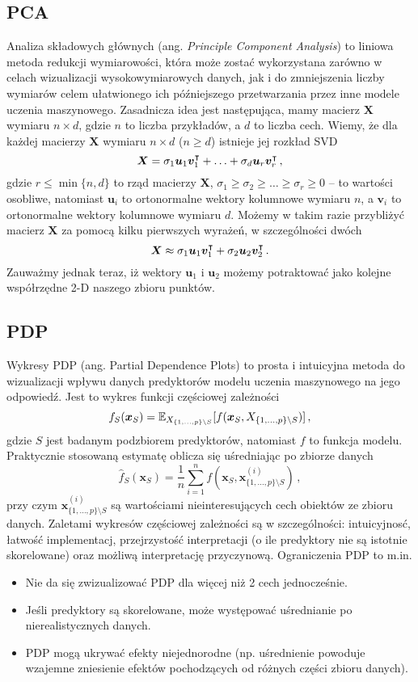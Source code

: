 \documentclass{myclass}
\begin{document}
\subsection{PCA}

Analiza składowych głównych (ang. \emph{Principle Component Analysis}) to liniowa metoda redukcji
wymiarowości, która może zostać wykorzystana zarówno w celach wizualizacji wysokowymiarowych danych,
jak i do zmniejszenia liczby wymiarów celem ułatwionego ich późniejszego przetwarzania przez inne
modele uczenia maszynowego. Zasadnicza idea jest następująca, mamy macierz \(\bm{X}\) wymiaru \(n
\times d\), gdzie \(n\) to liczba przykładów, a \(d\) to liczba cech. Wiemy, że dla każdej macierzy
\(\bm{X}\) wymiaru \(n \times d\) (\(n \geq d\)) istnieje jej rozkład SVD 
\[
    \bm{X} = \sigma_1 \bm{u}_1 \bm{v}_1^\intercal + \ldots + \sigma_d \bm{u}_{r} \bm{v}_r^\intercal\,,
\]
gdzie \(r \leq \min\{n,d\}\) to rząd macierzy \(\bm{X}\), \(\sigma_1 \geq \sigma_2 \geq \ldots \geq
\sigma_r \geq 0\) -- to wartości osobliwe, natomiast \(\bm{u}_i\) to ortonormalne wektory kolumnowe
wymiaru \(n\), a \(\bm{v}_i\) to ortonormalne wektory kolumnowe wymiaru \(d\). Możemy w takim razie
przybliżyć macierz \(\bm{X}\) za pomocą kilku pierwszych wyrażeń, w szczególności dwóch
\[
    \bm{X} \approx \sigma_1 \bm{u}_1 \bm{v}_1^\intercal + \sigma_2 \bm{u}_2 \bm{v}_2^\intercal\,.
\]
Zauważmy jednak teraz, iż wektory \(\bm{u}_1\) i \(\bm{u}_2\) możemy potraktować jako kolejne
współrzędne 2-D naszego zbioru punktów.


\subsection{PDP}

Wykresy PDP (ang. Partial Dependence Plots) to prosta i intuicyjna metoda do wizualizacji wpływu
danych predyktorów modelu uczenia maszynowego na jego odpowiedź. Jest to wykres funkcji częściowej
zależności
\[
    f_S(\bm{x}_S) = \mathbb{E}_{X_{\{1,\ldots,p\}\setminus S}}[f(\bm{x}_S, X_{\{1,\ldots,p\}\setminus S})]\,,
\]
gdzie $S$ jest badanym podzbiorem predyktorów, natomiast $f$ to funkcja modelu. Praktycznie
stosowaną estymatę oblicza się uśredniając po zbiorze danych
\[
    \hat{f}_S(\bm{x}_S) = \frac{1}{n} \sum_{i=1}^n f(\bm{x}_S, \bm{x}^{(i)}_{\{1,\ldots,p\}\setminus S})\,,
\]
przy czym $\bm{x}^{(i)}_{\{1,\ldots,p\}\setminus S}$ są wartościami nieinteresujących cech obiektów
ze zbioru danych. Zaletami wykresów częściowej zależności są w szczególności: intuicyjnosć, łatwość
implementacj, przejrzystość interpretacji (o ile predyktory nie są istotnie skorelowane) oraz
możliwą interpretację przyczynową. Ograniczenia PDP to m.in. 
\begin{itemize}
    \item Nie da się zwizualizować PDP dla więcej niż 2 cech jednocześnie.
    \item Jeśli predyktory są skorelowane, może występować uśrednianie po nierealistycznych danych.
    \item PDP mogą ukrywać efekty niejednorodne (np. uśrednienie powoduje wzajemne zniesienie
          efektów pochodzących od różnych części zbioru danych).
\end{itemize}
\end{document}
